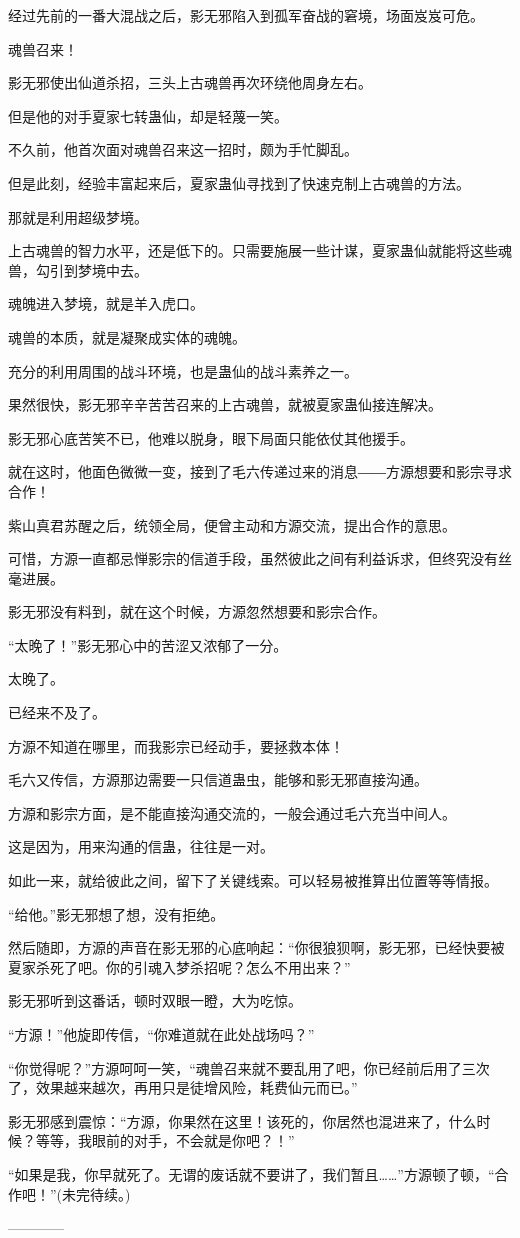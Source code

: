 \begin{this_body}
经过先前的一番大混战之后，影无邪陷入到孤军奋战的窘境，场面岌岌可危。

魂兽召来！

影无邪使出仙道杀招，三头上古魂兽再次环绕他周身左右。

但是他的对手夏家七转蛊仙，却是轻蔑一笑。

不久前，他首次面对魂兽召来这一招时，颇为手忙脚乱。

但是此刻，经验丰富起来后，夏家蛊仙寻找到了快速克制上古魂兽的方法。

那就是利用超级梦境。

上古魂兽的智力水平，还是低下的。只需要施展一些计谋，夏家蛊仙就能将这些魂兽，勾引到梦境中去。

魂魄进入梦境，就是羊入虎口。

魂兽的本质，就是凝聚成实体的魂魄。

充分的利用周围的战斗环境，也是蛊仙的战斗素养之一。

果然很快，影无邪辛辛苦苦召来的上古魂兽，就被夏家蛊仙接连解决。

影无邪心底苦笑不已，他难以脱身，眼下局面只能依仗其他援手。

就在这时，他面色微微一变，接到了毛六传递过来的消息――方源想要和影宗寻求合作！

紫山真君苏醒之后，统领全局，便曾主动和方源交流，提出合作的意思。

可惜，方源一直都忌惮影宗的信道手段，虽然彼此之间有利益诉求，但终究没有丝毫进展。

影无邪没有料到，就在这个时候，方源忽然想要和影宗合作。

“太晚了！”影无邪心中的苦涩又浓郁了一分。

太晚了。

已经来不及了。

方源不知道在哪里，而我影宗已经动手，要拯救本体！

毛六又传信，方源那边需要一只信道蛊虫，能够和影无邪直接沟通。

方源和影宗方面，是不能直接沟通交流的，一般会通过毛六充当中间人。

这是因为，用来沟通的信蛊，往往是一对。

如此一来，就给彼此之间，留下了关键线索。可以轻易被推算出位置等等情报。

“给他。”影无邪想了想，没有拒绝。

然后随即，方源的声音在影无邪的心底响起：“你很狼狈啊，影无邪，已经快要被夏家杀死了吧。你的引魂入梦杀招呢？怎么不用出来？”

影无邪听到这番话，顿时双眼一瞪，大为吃惊。

“方源！”他旋即传信，“你难道就在此处战场吗？”

“你觉得呢？”方源呵呵一笑，“魂兽召来就不要乱用了吧，你已经前后用了三次了，效果越来越次，再用只是徒增风险，耗费仙元而已。”

影无邪感到震惊：“方源，你果然在这里！该死的，你居然也混进来了，什么时候？等等，我眼前的对手，不会就是你吧？！”

“如果是我，你早就死了。无谓的废话就不要讲了，我们暂且……”方源顿了顿，“合作吧！”(未完待续。)

------------

\end{this_body}

